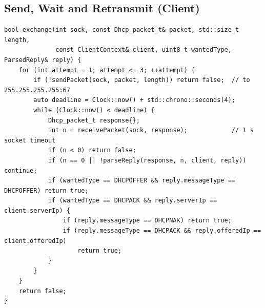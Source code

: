\documentclass[11pt]{article}
\begin{document}
\subsection{Send, Wait and Retransmit (Client)}
\begin{lstlisting}
bool exchange(int sock, const Dhcp_packet_t& packet, std::size_t length,
              const ClientContext& client, uint8_t wantedType, ParsedReply& reply) {
    for (int attempt = 1; attempt <= 3; ++attempt) {
        if (!sendPacket(sock, packet, length)) return false;  // to 255.255.255.255:67
        auto deadline = Clock::now() + std::chrono::seconds(4);
        while (Clock::now() < deadline) {
            Dhcp_packet_t response{};
            int n = receivePacket(sock, response);            // 1 s socket timeout
            if (n < 0) return false;
            if (n == 0 || !parseReply(response, n, client, reply)) continue;
            if (wantedType == DHCPOFFER && reply.messageType == DHCPOFFER) return true;
            if (wantedType == DHCPACK && reply.serverIp == client.serverIp) {
                if (reply.messageType == DHCPNAK) return true;
                if (reply.messageType == DHCPACK && reply.offeredIp == client.offeredIp)
                    return true;
            }
        }
    }
    return false;
}
\end{lstlisting}
\end{document}
